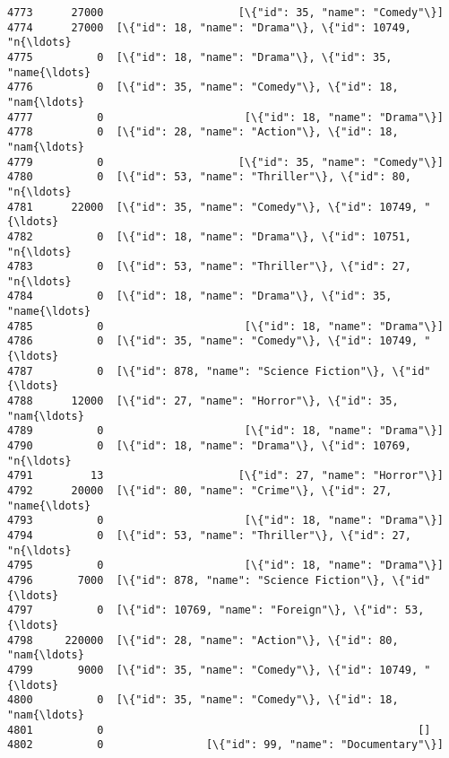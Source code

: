 \documentclass[11pt]{article}
\begin{document}
\begin{Verbatim}[commandchars=\\\{\}]
4773      27000                     [\{"id": 35, "name": "Comedy"\}]   
4774      27000  [\{"id": 18, "name": "Drama"\}, \{"id": 10749, "n{\ldots}   
4775          0  [\{"id": 18, "name": "Drama"\}, \{"id": 35, "name{\ldots}   
4776          0  [\{"id": 35, "name": "Comedy"\}, \{"id": 18, "nam{\ldots}   
4777          0                      [\{"id": 18, "name": "Drama"\}]   
4778          0  [\{"id": 28, "name": "Action"\}, \{"id": 18, "nam{\ldots}   
4779          0                     [\{"id": 35, "name": "Comedy"\}]   
4780          0  [\{"id": 53, "name": "Thriller"\}, \{"id": 80, "n{\ldots}   
4781      22000  [\{"id": 35, "name": "Comedy"\}, \{"id": 10749, "{\ldots}   
4782          0  [\{"id": 18, "name": "Drama"\}, \{"id": 10751, "n{\ldots}   
4783          0  [\{"id": 53, "name": "Thriller"\}, \{"id": 27, "n{\ldots}   
4784          0  [\{"id": 18, "name": "Drama"\}, \{"id": 35, "name{\ldots}   
4785          0                      [\{"id": 18, "name": "Drama"\}]   
4786          0  [\{"id": 35, "name": "Comedy"\}, \{"id": 10749, "{\ldots}   
4787          0  [\{"id": 878, "name": "Science Fiction"\}, \{"id"{\ldots}   
4788      12000  [\{"id": 27, "name": "Horror"\}, \{"id": 35, "nam{\ldots}   
4789          0                      [\{"id": 18, "name": "Drama"\}]   
4790          0  [\{"id": 18, "name": "Drama"\}, \{"id": 10769, "n{\ldots}   
4791         13                     [\{"id": 27, "name": "Horror"\}]   
4792      20000  [\{"id": 80, "name": "Crime"\}, \{"id": 27, "name{\ldots}   
4793          0                      [\{"id": 18, "name": "Drama"\}]   
4794          0  [\{"id": 53, "name": "Thriller"\}, \{"id": 27, "n{\ldots}   
4795          0                      [\{"id": 18, "name": "Drama"\}]   
4796       7000  [\{"id": 878, "name": "Science Fiction"\}, \{"id"{\ldots}   
4797          0  [\{"id": 10769, "name": "Foreign"\}, \{"id": 53, {\ldots}   
4798     220000  [\{"id": 28, "name": "Action"\}, \{"id": 80, "nam{\ldots}   
4799       9000  [\{"id": 35, "name": "Comedy"\}, \{"id": 10749, "{\ldots}   
4800          0  [\{"id": 35, "name": "Comedy"\}, \{"id": 18, "nam{\ldots}   
4801          0                                                 []   
4802          0                [\{"id": 99, "name": "Documentary"\}]   


\end{Verbatim}
\end{document}
